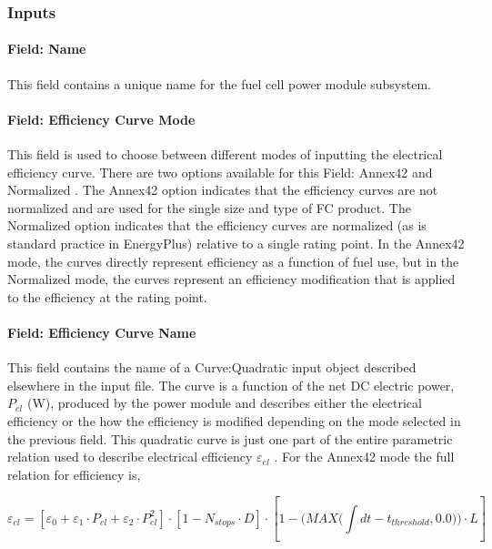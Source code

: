 \subsubsection{Inputs}\label{inputs-13-003}

\paragraph{Field: Name}\label{field-name-14-001}

This field contains a unique name for the fuel cell power module subsystem.

\paragraph{Field: Efficiency Curve Mode}\label{field-efficiency-curve-mode}

This field is used to choose between different modes of inputting the electrical efficiency curve. There are two options available for this Field: Annex42 and Normalized . The Annex42 option indicates that the efficiency curves are not normalized and are used for the single size and type of FC product. The Normalized option indicates that the efficiency curves are normalized (as is standard practice in EnergyPlus) relative to a single rating point. In the Annex42 mode, the curves directly represent efficiency as a function of fuel use, but in the Normalized mode, the curves represent an efficiency modification that is applied to the efficiency at the rating point.

\paragraph{Field: Efficiency Curve Name}\label{field-efficiency-curve-name}

This field contains the name of a Curve:Quadratic input object described elsewhere in the input file. The curve is a function of the net DC electric power, \({P_{el}}\) (W), produced by the power module and describes either the electrical efficiency or the how the efficiency is modified depending on the mode selected in the previous field. This quadratic curve is just one part of the entire parametric relation used to describe electrical efficiency \({\varepsilon_{el}}\) . For the Annex42 mode the full relation for efficiency is,

\begin{equation}
{\varepsilon_{el}} = \left[ {{\varepsilon_0} + {\varepsilon_1} \cdot {P_{el}} + {\varepsilon_2} \cdot P_{el}^2} \right] \cdot \left[ {1 - {N_{stops}} \cdot D} \right] \cdot \left[ {1 - (MAX(\int\limits_{} {dt - {t_{threshold}},0.0))}  \cdot L} \right]
\end{equation}


